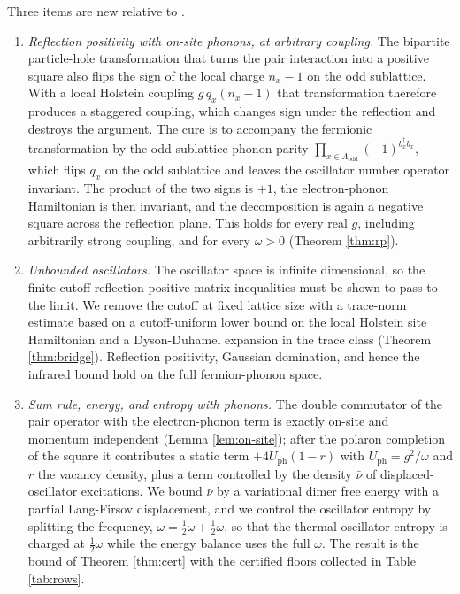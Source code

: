 \documentclass[11pt]{article}
\numberwithin{equation}{section}
\newcommand{\Lamb}{\Lambda}
\theoremstyle{definition}
\begin{document}
Three items are new relative to \cite{rens2026pkodlro}.

\begin{enumerate}
\item \emph{Reflection positivity with on-site phonons, at arbitrary coupling.} The
  bipartite particle-hole transformation that turns the pair interaction into a
  positive square also flips the sign of the local charge $n_{x}-1$ on the odd
  sublattice. With a local Holstein coupling $g\,q_{x}(n_{x}-1)$ that transformation
  therefore produces a staggered coupling, which changes sign under the reflection and
  destroys the argument. The cure is to accompany the fermionic transformation by the
  odd-sublattice phonon parity $\prod_{x\in\Lamb_{\text{odd}}}(-1)^{b_{x}^{\dagger}b_{x}}$,
  which flips $q_{x}$ on the odd sublattice and leaves the oscillator number operator
  invariant. The product of the two signs is $+1$, the electron-phonon Hamiltonian is
  then invariant, and the decomposition is again a negative square across the
  reflection plane. This holds for every real $g$, including arbitrarily strong
  coupling, and for every $\omega>0$ (Theorem \ref{thm:rp}).
\item \emph{Unbounded oscillators.} The oscillator space is infinite dimensional, so
  the finite-cutoff reflection-positive matrix inequalities must be shown to pass to
  the limit. We remove the cutoff at fixed lattice size with a trace-norm estimate
  based on a cutoff-uniform lower bound on the local Holstein site Hamiltonian and a
  Dyson-Duhamel expansion in the trace class (Theorem \ref{thm:bridge}). Reflection
  positivity, Gaussian domination, and hence the infrared bound hold on the full
  fermion-phonon space.
\item \emph{Sum rule, energy, and entropy with phonons.} The double commutator of the
  pair operator with the electron-phonon term is exactly on-site and momentum
  independent (Lemma \ref{lem:on-site}); after the polaron completion of the square it
  contributes a static term $+4U_{\mathrm{ph}}(1-r)$ with $U_{\mathrm{ph}}=g^{2}/\omega$
  and $r$ the vacancy density, plus a term controlled by the density $\bar\nu$ of
  displaced-oscillator excitations. We bound $\bar\nu$ by a variational dimer free
  energy with a partial Lang-Firsov \cite{langfirsov1963} displacement, and we control
  the oscillator entropy by splitting the frequency, $\omega=\tfrac12\omega+\tfrac12\omega$,
  so that the thermal oscillator entropy is charged at $\tfrac12\omega$ while the
  energy balance uses the full $\omega$. The result is the bound of Theorem
  \ref{thm:cert} with the certified floors collected in Table \ref{tab:rows}.
\end{enumerate}
\end{document}
